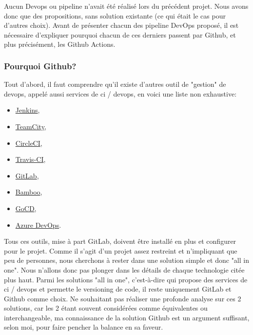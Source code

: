\documentclass[
    iai, %
    il, %
]{heig-tb}
\begin{document}
Aucun Devops ou pipeline n'avait été réalisé lors du précédent projet.
Nous avons donc que des propositions, sans solution existante (ce qui était le cas pour d'autres choix).\newline
Avant de présenter chacun des pipeline DevOps proposé, il est nécessaire d'expliquer pourquoi chacun de ces derniers passent par Github, et plus précisément, les Github Actions.

\subsubsection{Pourquoi Github?}
Tout d'abord, il faut comprendre qu'il existe d'autres outil de "gestion" de \Gls{devops}, appelé
aussi services de \Gls{ci} / \Gls{devops}, en voici une liste non exhaustive:
\begin{multicols}{2}
    \begin{itemize}
        \item \href{https://www.jenkins.io/}{Jenkins},
        \item \href{https://www.jetbrains.com/teamcity/}{TeamCity},
        \item \href{https://www.guru99.com/top-20-continuous-integration-tools.html}{CircleCI},
        \item \href{https://www.travis-ci.com/}{Travis-CI},
        \item \href{https://about.gitlab.com/}{GitLab},
        \item \href{https://www.atlassian.com/software/bamboo}{Bamboo},
        \item \href{https://www.gocd.org/}{GoCD},
        \item \href{https://azure.microsoft.com/fr-fr/services/devops/}{Azure DevOps}.
    \end{itemize}
\end{multicols}

Tous ces outils, mise à part GitLab, doivent être installé en plus et configurer pour le projet.\newline
Comme il s'agit d'un projet assez restreint et n'impliquant que peu de personnes, nous cherchons à rester dans une solution simple et donc "all in one".\newline
Nous n'allons donc pas plonger dans les détails de chaque technologie citée plus haut.\newline
Parmi les solutions "all in one", c'est-à-dire qui propose des services de \Gls{ci} / \Gls{devops} et permette le versioning de code, il reste uniquement GitLab et Github comme choix.\newline
Ne souhaitant pas réaliser une profonde analyse sur ces 2 solutions, car les 2 étant souvent considérées comme équivalentes ou interchangeable, ma connaissance de la solution Github est un argument suffisant, selon moi, pour faire pencher la balance en sa faveur.
\end{document}
